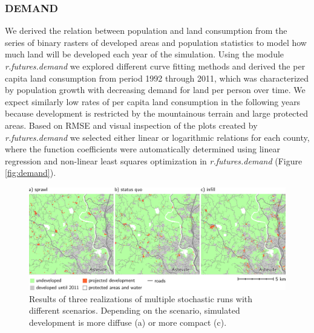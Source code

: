 \documentclass{isprs}
\begin{document}
\subsubsection{DEMAND}
We derived the relation between population
and land consumption
from the series of binary rasters of developed areas and
population statistics
to model how much land will be developed
each year of the simulation.
Using the module \emph{r.futures.demand} we explored different curve fitting
methods and derived the per capita land consumption
from period 1992 through 2011, which was characterized by
population growth with decreasing demand for land per person over time.
We expect similarly low rates of per capita land consumption
in the following years because development is restricted by the mountainous terrain and
large protected areas.
Based on RMSE and visual inspection of the plots
created by \emph{r.futures.demand} we
selected either linear or logarithmic relations %
for each county, where the function coefficients were  automatically determined using linear regression and non-linear least squares optimization 
in \emph{r.futures.demand} (Figure \ref{fig:demand}).


\begin{figure}[tbh]
 \centering
 \includegraphics[width=2.0\columnwidth]{./figures/results_maps.pdf}
 \caption{Results of three realizations of multiple stochastic runs with different scenarios.
 Depending on the scenario, simulated development is more diffuse (a) or more compact (c).}
 \label{fig:results}
\end{figure}
\end{document}

